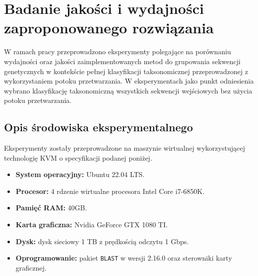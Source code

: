 \cleardoublepage
\section{Badanie jakości i wydajności zaproponowanego rozwiązania}

    W ramach pracy przeprowadzono eksperymenty polegające na porównaniu wydajności oraz jakości zaimplementowanych metod do grupowania sekwencji genetycznych w kontekście pełnej klasyfikacji taksonomicznej przeprowadzonej z wykorzystaniem potoku przetwarzania. W eksperymentach jako punkt odniesienia wybrano klasyfikację taksonomiczną wszystkich sekwencji wejściowych bez użycia potoku przetwarzania.

    \subsection{Opis środowiska eksperymentalnego}

        Eksperymenty zostały przeprowadzone na maszynie wirtualnej wykorzystującej technologię KVM o specyfikacji podanej poniżej.


            \begin{itemize}
                \item {
                    \textbf{System operacyjny:} Ubuntu 22.04 LTS.
                }
                \item {
                    \textbf{Procesor:} 4 rdzenie wirtualne procesora Intel Core i7-6850K.
                }
                \item {
                    \textbf{Pamięć RAM:} 40GB.
                }
                \item {
                    \textbf{Karta graficzna:} Nvidia GeForce GTX 1080 TI.
                }
                \item {
                    \textbf{Dysk:} dysk sieciowy 1 TB z prędkością odczytu 1 Gbps.
                }
                \item {
                    \textbf{Oprogramowanie:} pakiet \texttt{BLAST} w wersji 2.16.0 oraz sterowniki karty graficznej.
                }
            \end{itemize}


